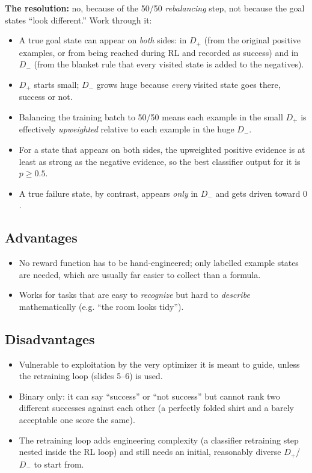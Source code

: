 \documentclass[11pt]{article}
\begin{document}
\textbf{The resolution:} no, because of the 50/50 \emph{rebalancing} step, not
because the goal states ``look different.'' Work through it:
\begin{itemize}
  \item A true goal state can appear on \emph{both} sides: in $D_+$ (from the
  original positive examples, or from being reached during RL and recorded as
  success) and in $D_-$ (from the blanket rule that every visited state is added
  to the negatives).
  \item $D_+$ starts small; $D_-$ grows huge because \emph{every} visited state
  goes there, success or not.
  \item Balancing the training batch to 50/50 means each example in the small
  $D_+$ is effectively \emph{upweighted} relative to each example in the huge
  $D_-$.
  \item For a state that appears on both sides, the upweighted positive evidence
  is at least as strong as the negative evidence, so the best classifier output
  for it is $p \ge 0.5$.
  \item A true failure state, by contrast, appears \emph{only} in $D_-$ and gets
  driven toward $0$.
\end{itemize}

\subsection{Advantages}
\begin{itemize}
  \item No reward function has to be hand-engineered; only labelled example
  states are needed, which are usually far easier to collect than a formula.
  \item Works for tasks that are easy to \emph{recognize} but hard to
  \emph{describe} mathematically (e.g. ``the room looks tidy'').
\end{itemize}

\subsection{Disadvantages}
\begin{itemize}
  \item Vulnerable to exploitation by the very optimizer it is meant to guide,
  unless the retraining loop (slides 5--6) is used.
  \item Binary only: it can say ``success'' or ``not success'' but cannot rank two
  different successes against each other (a perfectly folded shirt and a barely
  acceptable one score the same).
  \item The retraining loop adds engineering complexity (a classifier retraining
  step nested inside the RL loop) and still needs an initial, reasonably diverse
  $D_+$/$D_-$ to start from.
\end{itemize}
\end{document}
